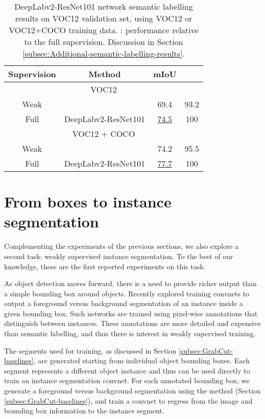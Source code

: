 \documentclass[10pt,english,british,twocolumn]{article}
\providecommand{\tabularnewline}{\\}
\begin{document}
\begin{table}
\begin{centering}
\begin{tabular}{c|c|cc}
Supervision & Method & mIoU & \tabularnewline
\hline 
\hline 
\multicolumn{4}{c}{\cellcolor{verylightgray}VOC12}\tabularnewline
\multirow{1}{*}{Weak} &  & 69.4 & 93.2\tabularnewline
Full & DeepLabv2-ResNet101 \cite{Chen2016ArxivDeeplabv2} & \uline{74.5} & 100\tabularnewline
\hline 
\hline 
\multicolumn{4}{c}{\cellcolor{verylightgray}VOC12 + COCO}\tabularnewline
\multirow{1}{*}{Weak} &  & 74.2 & 95.5\tabularnewline
\multirow{1}{*}{Full} & DeepLabv2-ResNet101 \cite{Chen2016ArxivDeeplabv2} & \uline{77.7} & 100\tabularnewline
\end{tabular}\vspace{-0.5em}
\par\end{centering}
\caption{\label{tab:Semantic-labelling-results-ResNet}Deep\-Lab\-v2-ResNet101
network semantic labelling results on VOC12 validation set, using
VOC12 or VOC12+COCO training data. : performance relative
to the full supervision. Discussion in Section \ref{subsec:Additional-semantic-labelling-results}.}

\vspace{-1em}
\end{table}


\section{\label{sec:Instance-segmentation}From boxes to instance segmentation}

Complementing the experiments of the previous sections, we also explore
a second task: weakly supervised instance segmentation. To the best
of our knowledge, these are the first reported experiments on this
task. 

As object detection moves forward, there is a need to provide richer
output than a simple bounding box around objects. Recently \cite{Hariharan2015Cvpr,Pinheiro2015Nips,Pinheiro2016Eccv}
explored training convnets to output a foreground versus background
segmentation of an instance inside a given bounding box. Such networks
are trained using pixel-wise annotations that distinguish between
instances. These annotations are more detailed and expensive than
semantic labelling, and thus there is interest in weakly supervised
training.

The segments used for training, as discussed in Section \ref{subsec:GrabCut-baselines},
are generated starting from individual object bounding boxes. Each
segment represents a different object instance and thus can be used
directly to train an instance segmentation convnet. For each annotated
bounding box, we generate a foreground versus background segmentation
using the  method (Section \ref{subsec:GrabCut-baselines}),
and train a convnet to regress from the image and bounding box information
to the instance segment.
\end{document}
